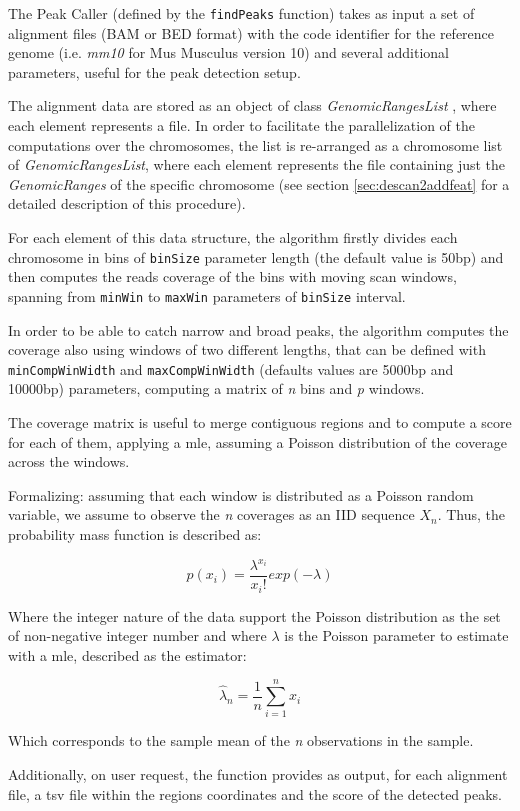 The Peak Caller (defined by the \lstinline!findPeaks! function) takes as input a set of alignment files (BAM \cite{Li2009} or BED format) with the code identifier for the reference genome (i.e. \textit{mm10} for Mus Musculus version 10) and several additional parameters, useful for the peak detection setup.

The alignment data are stored as an object of class \textit{GenomicRangesList} \cite{Lawrence2013}, where each element represents a file. 
In order to facilitate the parallelization of the computations over the chromosomes, the list is re-arranged as a chromosome list of \textit{GenomicRangesList}, where each element represents the file containing just the \textit{GenomicRanges} of the specific chromosome (see section \ref{sec:descan2addfeat} for a detailed description of this procedure).

For each element of this data structure, the algorithm firstly divides each chromosome in bins of \lstinline!binSize! parameter length (the default value is 50bp) and then computes the reads coverage of the bins with moving scan windows, spanning from \lstinline!minWin! to \lstinline!maxWin! parameters of \lstinline!binSize! interval.

In order to be able to catch narrow and broad peaks, the algorithm computes the coverage also using windows of two different lengths, that can be defined with \lstinline!minCompWinWidth! and \lstinline!maxCompWinWidth! (defaults values are 5000bp and 10000bp) parameters, computing a matrix of \textit{n} bins and \textit{p} windows.

The coverage matrix is useful to merge contiguous regions and to compute a score for each of them, applying a \gls{mle}, assuming a Poisson distribution of the coverage across the windows.

Formalizing: assuming that each window is distributed as a Poisson random variable, we assume to observe the \textit{n} coverages as an IID sequence $X_n$. Thus, the probability mass function is described as:

\[ p(x_i) = \frac{\lambda^{x_i}}{{x_i!}} exp(-\lambda)\]

Where the integer nature of the data support the Poisson distribution as the set of non-negative integer number and where $\lambda$ is the Poisson parameter to estimate with a \gls{mle}, described as the estimator:

\[\hat{\lambda}_n=\frac{1}{n}\sum_{i=1}^{n}x_i\]

Which corresponds to the sample mean of the \textit{n} observations in the sample.



Additionally, on user request, the function provides as output, for each alignment file, a \gls{tsv} file within the regions coordinates and the score of the detected peaks.


